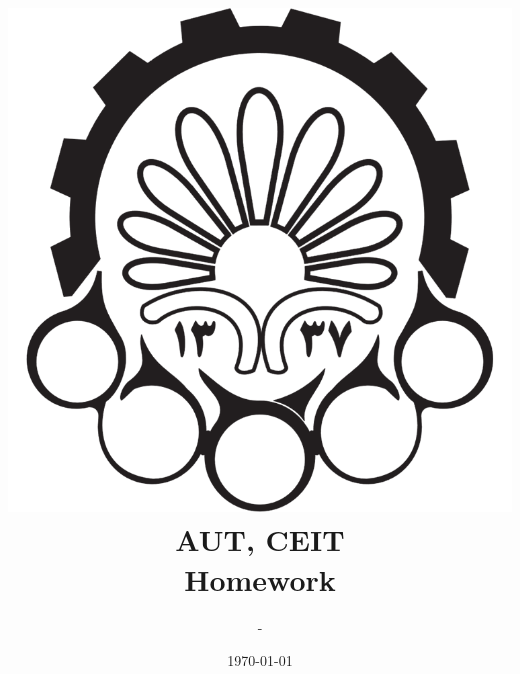 \documentclass[10pt, a4paper]{article}
\title{
	\includegraphics{aut-logo.png}\\
	AUT, CEIT \course \\
	\numofhw Homework
}
\author{\writer - \stdnum}
\date{\today}
\begin{document}
\maketitle
\pagebreak
\end{document}
